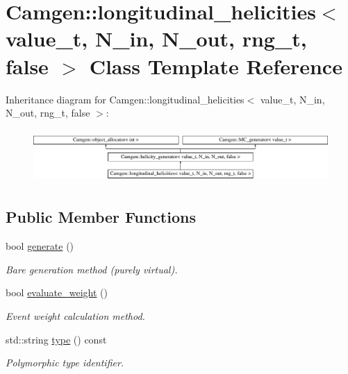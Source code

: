 \hypertarget{a00332}{}\section{Camgen\+:\+:longitudinal\+\_\+helicities$<$ value\+\_\+t, N\+\_\+in, N\+\_\+out, rng\+\_\+t, false $>$ Class Template Reference}
\label{a00332}
Inheritance diagram for Camgen\+:\+:longitudinal\+\_\+helicities$<$ value\+\_\+t, N\+\_\+in, N\+\_\+out, rng\+\_\+t, false $>$\+:\begin{figure}[H]
\begin{center}
\leavevmode
\includegraphics[height=2.058824cm]{a00332}
\end{center}
\end{figure}
\subsection*{Public Member Functions}
\begin{DoxyCompactItemize}
\item 
bool \hyperlink{a00332_a3d2bc9d0b8d805fc43dab21117f0ddbd}{generate} ()
\begin{DoxyCompactList}\small\item\em \textquotesingle{}Bare generation\textquotesingle{} method (purely virtual). \end{DoxyCompactList}\item 
\hypertarget{a00332_af5ce289499d17bf75c5cb320d3d590fa}{}bool \hyperlink{a00332_af5ce289499d17bf75c5cb320d3d590fa}{evaluate\+\_\+weight} ()\label{a00332_af5ce289499d17bf75c5cb320d3d590fa}

\begin{DoxyCompactList}\small\item\em Event weight calculation method. \end{DoxyCompactList}\item 
\hypertarget{a00332_adf5c08c9ce9c8103ac2f5a088cf5b455}{}std\+::string \hyperlink{a00332_adf5c08c9ce9c8103ac2f5a088cf5b455}{type} () const \label{a00332_adf5c08c9ce9c8103ac2f5a088cf5b455}

\begin{DoxyCompactList}\small\item\em Polymorphic type identifier. \end{DoxyCompactList}\end{DoxyCompactItemize}
